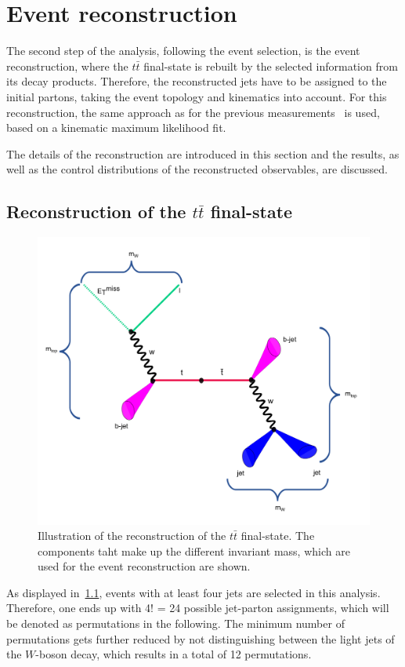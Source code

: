 \chapter{Event reconstruction}\label{ch5}
The second step of the analysis, following the event selection, is the event reconstruction, where the $t\bar{t}$ final-state is rebuilt by the selected information from its decay products. Therefore, the reconstructed jets have to be assigned to the initial partons, taking the event topology and kinematics into account. For this reconstruction, the same approach as for the previous measurements~\cite{Aad:2015nba, ATLAS-CONF-2017-071} is used, based on a kinematic maximum likelihood fit. 

The details of the reconstruction are introduced in this section and the results, as well as the control distributions of the reconstructed observables, are discussed.  


\section{Reconstruction of the $t\bar{t}$ final-state}
\begin{figure}[h]
	\centering
	\includegraphics[width=0.65\linewidth]{Pics/cp5/51}
	\caption{ Illustration of the reconstruction of the $t\bar{t}$ final-state. The components taht make up the different invariant mass, which are used for the event reconstruction are shown.
	} 
	\label{fig:51}
\end{figure}

As displayed in~\cref{fig:51}, events with at least four jets are selected in this analysis. Therefore, one ends up with 4! = 24 possible jet-parton assignments, which will be denoted as permutations in the following. The minimum number of permutations gets further reduced by not distinguishing between the light jets of the $W$-boson decay, which results in a total of 12 permutations. 

